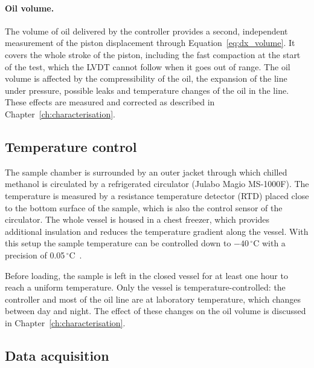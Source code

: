 \paragraph{Oil volume.} The volume of oil delivered by the controller provides a second, independent measurement of the piston displacement through Equation~\eqref{eq:dx_volume}. It covers the whole stroke of the piston, including the fast compaction at the start of the test, which the LVDT cannot follow when it goes out of range. The oil volume is affected by the compressibility of the oil, the expansion of the line under pressure, possible leaks and temperature changes of the oil in the line. These effects are measured and corrected as described in Chapter~\ref{ch:characterisation}.

\subsection{Temperature control}
\label{subsec:temperature_control}

The sample chamber is surrounded by an outer jacket through which chilled methanol is circulated by a refrigerated circulator (Julabo Magio MS-1000F). The temperature is measured by a resistance temperature detector (RTD) placed close to the bottom surface of the sample, which is also the control sensor of the circulator. The whole vessel is housed in a chest freezer, which provides additional insulation and reduces the temperature gradient along the vessel. With this setup the sample temperature can be controlled down to $-40\,^\circ$C with a precision of 0.05\,$^\circ$C~\cite{skarbek2025data}.

Before loading, the sample is left in the closed vessel for at least one hour to reach a uniform temperature. Only the vessel is temperature-controlled: the controller and most of the oil line are at laboratory temperature, which changes between day and night. The effect of these changes on the oil volume is discussed in Chapter~\ref{ch:characterisation}.

\subsection{Data acquisition}
\label{subsec:daq}

